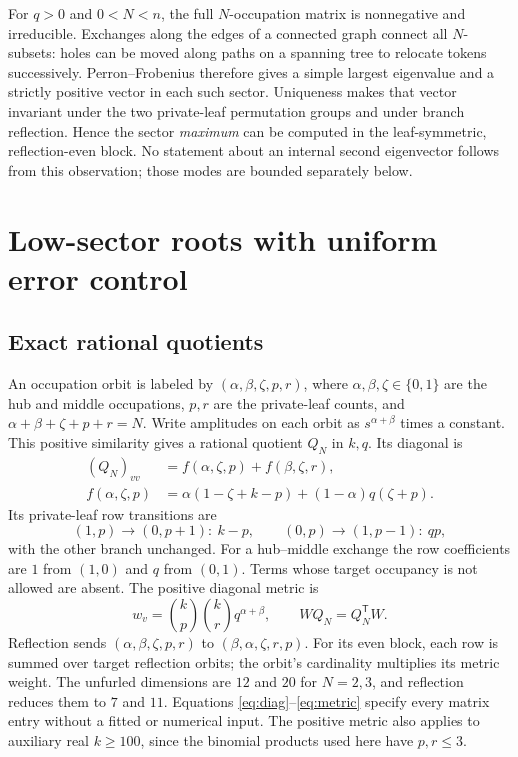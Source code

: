 \documentclass[11pt]{article}
\begin{document}
For $q>0$ and $0<N<n$, the full $N$-occupation matrix is nonnegative
and irreducible. Exchanges along the edges of a connected graph connect
all $N$-subsets: holes can be moved along paths on a spanning tree to
relocate tokens successively. Perron--Frobenius therefore gives a simple
largest eigenvalue and a strictly positive vector in each such sector.
Uniqueness makes that vector invariant under the two private-leaf
permutation groups and under branch reflection. Hence the sector
\emph{maximum} can be computed in the leaf-symmetric, reflection-even
block. No statement about an internal second eigenvector follows from
this observation; those modes are bounded separately below.

\section{Low-sector roots with uniform error control}

\subsection{Exact rational quotients}

An occupation orbit is labeled by $(\alpha,\beta,\zeta,p,r)$, where
$\alpha,\beta,\zeta\in\{0,1\}$ are the hub and middle occupations,
$p,r$ are the private-leaf counts, and
$\alpha+\beta+\zeta+p+r=N$. Write amplitudes on each orbit as
$s^{\alpha+\beta}$ times a constant. This positive similarity gives
a rational quotient $Q_N$ in $k,q$. Its diagonal is
\begin{align}
 (Q_N)_{vv}&=f(\alpha,\zeta,p)+f(\beta,\zeta,r),\label{eq:diag}\\
 f(\alpha,\zeta,p)&=\alpha(1-\zeta+k-p)
                    +(1-\alpha)q(\zeta+p).\nonumber
\end{align}
Its private-leaf row transitions are
\begin{equation}
 (1,p)\longrightarrow(0,p+1):\ k-p,\qquad
 (0,p)\longrightarrow(1,p-1):\ qp,
 \label{eq:private}
\end{equation}
with the other branch unchanged. For a hub--middle exchange the row
coefficients are $1$ from $(1,0)$ and $q$ from $(0,1)$. Terms whose
target occupancy is not allowed are absent. The positive diagonal metric is
\begin{equation}
 w_v=\binom{k}{p}\binom{k}{r}q^{\alpha+\beta},\qquad
 WQ_N=Q_N^{\mathsf T}W.
 \label{eq:metric}
\end{equation}
Reflection sends
$(\alpha,\beta,\zeta,p,r)$ to $(\beta,\alpha,\zeta,r,p)$.
For its even block, each row is summed over target reflection orbits;
the orbit's cardinality multiplies its metric weight. The unfurled
dimensions are $12$ and $20$ for $N=2,3$, and reflection reduces them
to $7$ and $11$. Equations \eqref{eq:diag}--\eqref{eq:metric} specify
every matrix entry without a fitted or numerical input. The positive
metric also applies to auxiliary real $k\geq100$, since the binomial
products used here have $p,r\leq3$.
\end{document}

